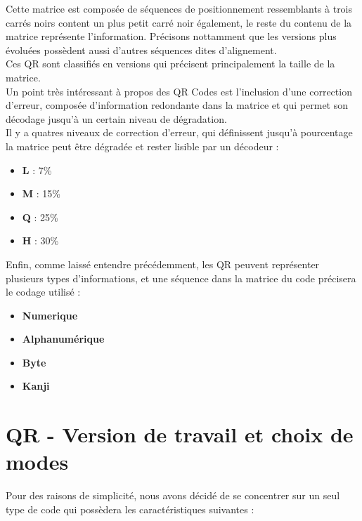 \documentclass{report}
\begin{document}
		Cette matrice est composée de séquences de positionnement ressemblants à trois carrés noirs content un plus petit carré noir également, le reste du contenu de la matrice représente l'information. Précisons nottamment que les versions plus évoluées possèdent aussi d'autres séquences dites d'alignement. \\
		Ces QR sont classifiés en versions qui précisent principalement la taille de la matrice.\\

		Un point très intéressant à propos des QR Codes est l'inclusion d'une correction d'erreur, composée d'information redondante dans la matrice et qui permet son décodage jusqu'à un certain niveau de dégradation.\\
		Il y a quatres niveaux de correction d'erreur, qui définissent jusqu'à pourcentage la matrice peut être dégradée et rester lisible par un décodeur : \\

		\begin{itemize}
			\item \textbf{L} : 7\%
			\item \textbf{M} : 15\%
			\item \textbf{Q} : 25\%
			\item \textbf{H} : 30\%\\
		\end{itemize}

		Enfin, comme laissé entendre précédemment, les QR peuvent représenter plusieurs types d'informations, et une séquence dans la matrice du code précisera le codage utilisé : \\

		\begin{itemize}
			\item \textbf{Numerique}
			\item \textbf{Alphanumérique}
			\item \textbf{Byte}
			\item \textbf{Kanji}\\
		\end{itemize}

	\section{QR - Version de travail et choix de modes}

		Pour des raisons de simplicité, nous avons décidé de se concentrer sur un seul type de code qui possèdera les caractéristiques suivantes : \\
\end{document}

